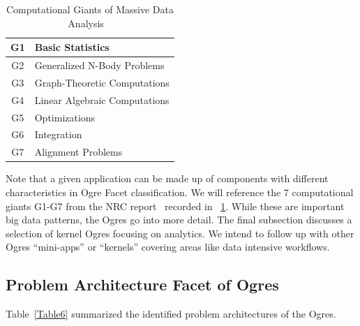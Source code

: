 \documentclass{acm_proc_article-sp}
\begin{document}
\begin{table}[h]
\centering
\caption{ Computational Giants of Massive Data Analysis ~\cite{b13}}
\label{Table5}
\begin{tabular}{|c|p{5cm}|} \hline
G1 & Basic Statistics \\ \hline
G2 & Generalized N-Body Problems \\ \hline
G3 & Graph-Theoretic Computations \\ \hline
G4 & Linear Algebraic Computations \\ \hline
G5 & Optimizations \\ \hline
G6 & Integration \\ \hline
G7 & Alignment Problems
\\ \hline
\end{tabular}
\end{table}

Note that a given application can be made up of components with different characteristics in Ogre Facet classification. We will reference the 7 computational giants G1-G7 from the NRC report~\cite{b13} recorded in ~\ref{Table5}. While these are important big data patterns, the Ogres go into more detail. The final subsection discusses a selection of kernel Ogres focusing on analytics. We intend to follow up with other Ogres ``mini-apps'' or ``kernels'' covering areas like data intensive workflows.


\subsection{Problem Architecture Facet of Ogres}

Table~\ref{Table6} summarized the identified problem architectures of the Ogres.
\end{document}
